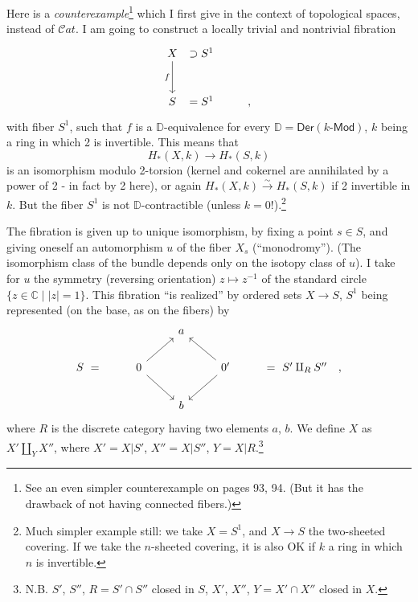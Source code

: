 \documentclass[11pt]{article}
\newcommand{\DD}{\mathbb{D}}
\newcommand{\Cat}{\mathcal{C}at}
\begin{document}
Here is a \textit{counterexample}\footnote[42]{See an even simpler counterexample on pages 93, 94. (But it has the drawback of not having connected fibers.) %
} which I first give in the context of topological spaces, instead of $\Cat$. I am going to construct a locally trivial and nontrivial fibration
\[
\begin{tikzcd}[column sep=0.2em, row sep=large]
X \arrow[d, "f"'] & \supset S^1 & \\
S & = S^1 & \qquad ,
\end{tikzcd}
\]
with fiber $S^1$, such that $f$ is a $\DD$-equivalence for every $\DD = \mathsf{Der}(k\text{-}\mathsf{Mod})$, $k$ being a ring in which 2 is invertible. This means that
\[
H_*(X,k) \longrightarrow H_*(S,k)
\]
is an isomorphism modulo 2-torsion (kernel and cokernel are annihilated by a power of 2 - in fact by 2 here), or again $H_*(X,k) \xrightarrow{\sim} H_*(S,k)$ if 2 invertible in $k$. But the fiber $S^1$ is not $\DD$-contractible (unless $k = 0$!).\footnote[43]{Much simpler example still: we take $X = S^1$, and $X \to S$ the two-sheeted covering. If we take the $n$-sheeted covering, it is also OK if $k$ a ring in which $n$ is invertible.}

\indent The fibration is given up to unique isomorphism, by fixing a point $s \in S$, and giving oneself an automorphism $u$ of the fiber $X_s$ (``monodromy''). (The isomorphism class of the bundle depends only on the isotopy class of $u$). I take for $u$ the symmetry (reversing orientation) $z \mapsto z^{-1}$ of the standard circle $\{z \in \mathbb{C} \mid |z| = 1\}$. This fibration ``is realized'' by ordered sets $X \to S$, $S^1$ being represented (on the base, as on the fibers) by %
\[
\begin{tikzcd}[column sep=normal, row sep=normal]
& & a & & \\
S \ = & 0 \arrow[ur] \arrow[dr] & & 0' \arrow[ul] \arrow[dl] & = \ S' \amalg_R S'' \quad , \\
& & b & &
\end{tikzcd}
\]
where $R$ is the discrete category having two elements $a$, $b$. We define $X$ as $X' \amalg_Y X''$, where $X' = X|S'$, $X'' = X|S''$, $Y = X|R$.\footnote[44]{N.B. $S'$, $S''$, $R = S' \cap S''$ closed in $S$, $X'$, $X''$, $Y = X' \cap X''$ closed in $X$.}
\end{document}
